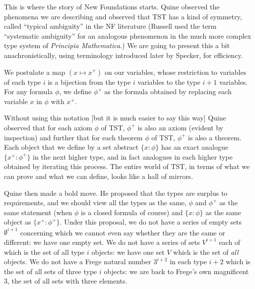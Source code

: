 \documentclass{slides}
\begin{document}
\begin{slide}

This is where the story of New Foundations starts.  Quine observed the phenomena we are describing and observed that TST has a kind of symmetry, called ``typical ambiguity'' in the NF literature (Russell used the term ``systematic ambiguity'' for an analogous phenomenon in the much more complex type system of {\em Principia Mathematica\/}.)  We are going to present this a bit anachronistically, using terminology introduced later by Specker, for efficiency.

We postulate a map $(x \mapsto x^+)$ on our variables, whose restriction to variables of each type $i$ is a bijection from the type $i$ variables to the type $i+1$ variables.  For any formula $\phi$, we define $\phi^+$
as the formula obtained by replacing each variable $x$ in $\phi$ with $x^+$.

\end{slide}

\begin{slide}

Without using this notation [but it is much easier to say this way] Quine observed that for each axiom $\phi$ of TST, $\phi^+$ is also an axiom (evident by inspection) and further that for each theorem $\phi$ of TST, $\phi^+$ is also a theorem.  Each object that we define by a set abstract $\{x:\phi\}$ has an exact analogue $\{x^+:\phi^+\}$ in the next higher type, and in fact analogues in each higher type obtained by iterating this process.  The entire world of TST, in terms of what we can prove and what we can define, looks like a hall of mirrors.

\end{slide}

\begin{slide}

Quine then made a bold move.  He proposed that the types are surplus to requirements, and we should view all the types as the same,  $\phi$ and $\phi^+$ as the same statement (when $\phi$ is a closed formula of course)
and $\{x:\phi\}$ as the same object as $\{x^+:\phi^+\}$.  Under this proposal, we do not have a series of empty sets $\emptyset^{i+1}$ concerning which we cannot even say whether they are the same or different:  we have one empty set.  We do not have a series of sets $V^{i+1}$ each of which is the set of all type $i$ objects:  we have one set $V$ which is the set of {\em all\/} objects.   We do not have a Frege natural number $3^{i+2}$ in each type $i+2$ which is the set of all sets of three type $i$ objects:  we are back to Frege's own magnificent 3, the set of all sets with three elements.


\end{slide}
\end{document}
